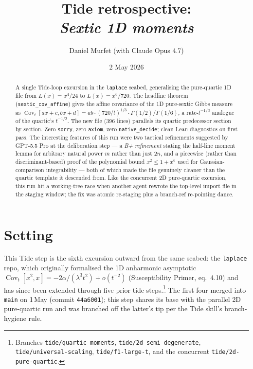 \documentclass[11pt]{article}
\title{Tide retrospective:\\\emph{Sextic 1D moments}}
\author{Daniel Murfet (with Claude Opus 4.7)}
\date{2 May 2026}
\begin{document}
\maketitle

\begin{abstract}
A single Tide-loop excursion in the \texttt{laplace} seabed, generalising
the pure-quartic 1D file from $L(x) = x^4/24$ to $L(x) = x^6/720$. The
headline theorem (\texttt{sextic\_cov\_affine}) gives the affine covariance
of the 1D pure-sextic Gibbs measure as
$\operatorname{Cov}_t[ax+c, bx+d] = ab \cdot (720/t)^{1/3} \cdot
\Gamma(1/2)/\Gamma(1/6)$, a rate-$t^{-1/3}$ analogue of the quartic's
$t^{-1/2}$. The new file (396 lines) parallels its quartic predecessor
section by section. Zero \texttt{sorry}, zero \texttt{axiom}, zero
\texttt{native\_decide}; clean Lean diagnostics on first pass. The
interesting features of this run were two tactical refinements suggested by
GPT-5.5 Pro at the deliberation step --- a \emph{B+ refinement} stating the
half-line moment lemma for arbitrary natural power $m$ rather than just
$2n$, and a piecewise (rather than discriminant-based) proof of the
polynomial bound $x^2 \leq 1 + x^6$ used for Gaussian-comparison
integrability --- both of which made the file genuinely cleaner than the
quartic template it descended from. Like the concurrent 2D pure-quartic
excursion, this run hit a working-tree race when another agent rewrote the
top-level import file in the staging window; the fix was atomic re-staging
plus a branch-ref re-pointing dance.
\end{abstract}

\section{Setting}

This Tide step is the sixth excursion outward from the same seabed: the
\texttt{laplace} repo, which originally formalised the 1D anharmonic
asymptotic $\operatorname{Cov}_t[x^2,x] = -2\alpha/(\lambda^3 t^2) +
o(t^{-2})$ (Susceptibility Primer, eq.~4.10) and has since been extended
through five prior tide steps.\footnote{Branches
\texttt{tide/quartic-moments}, \texttt{tide/2d-semi-degenerate},
\texttt{tide/universal-scaling}, \texttt{tide/f1-large-t}, and the
concurrent \texttt{tide/2d-pure-quartic}.}
The first four merged into \texttt{main} on 1\,May (commit
\texttt{44a6001}); this step shares its base with the parallel 2D
pure-quartic run and was branched off the latter's tip per the Tide skill's
branch-hygiene rule.
\end{document}
